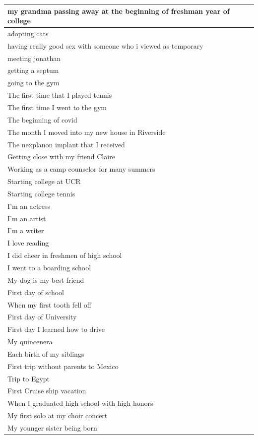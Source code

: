 \documentclass[
  .7em,
  letterpaper,
  DIV=11,
  numbers=noendperiod]{scrartcl}
\begin{document}
\begin{table}
\begin{tabular}{l}
\hline
my grandma passing away at the beginning of freshman year of college\\
\hline
adopting cats\\
\hline
having really good sex with someone who i viewed as temporary\\
\hline
meeting jonathan\\
\hline
getting a septum\\
\hline
going to the gym\\
\hline
The first time that I played tennis\\
\hline
The first time I went to the gym\\
\hline
The beginning of covid\\
\hline
The month I moved into my new house in Riverside\\
\hline
The nexplanon implant that I received\\
\hline
Getting close with my friend Claire\\
\hline
Working as a camp counselor for many summers\\
\hline
Starting college at UCR\\
\hline
Starting college tennis\\
\hline
I'm an actress\\
\hline
I'm an artist\\
\hline
I'm a writer\\
\hline
I love reading\\
\hline
I did cheer in freshmen of high school\\
\hline
I went to a boarding school\\
\hline
My dog is my best friend\\
\hline
First day of school\\
\hline
When my first tooth fell off\\
\hline
First day of University\\
\hline
First day I learned how to drive\\
\hline
My quincenera\\
\hline
Each birth of my siblings\\
\hline
First trip without parents to Mexico\\
\hline
Trip to Egypt\\
\hline
First Cruise ship vacation\\
\hline
When I graduated high school with high honors\\
\hline
My first solo at my choir concert\\
\hline
My younger sister being born\\

\end{tabular}
\end{table}
\end{document}
